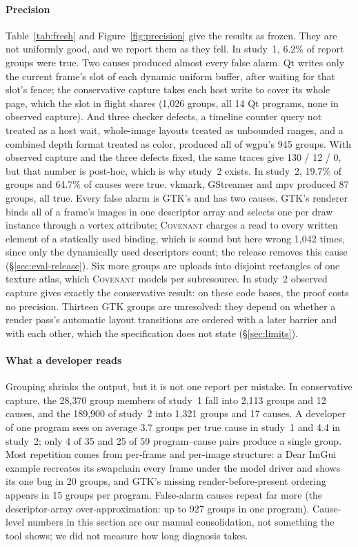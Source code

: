 \documentclass[acmtog,anonymous,review]{acmart}
\newcommand{\sys}{\textsc{Covenant}\xspace}
\begin{document}
\paragraph{Precision}
Table~\ref{tab:fresh} and Figure~\ref{fig:precision} give the results as frozen. They are not uniformly good, and we
report them as they fell. In study~1, 6.2\% of report groups were true. Two causes produced almost every false alarm.
Qt writes only the current frame's slot of each dynamic uniform buffer, after waiting for that slot's fence; the
conservative capture takes each host write to cover its whole page, which the slot in flight shares (1,026 groups,
all 14 Qt programs, none in observed capture). And three checker defects, a timeline counter query not treated as a
host wait, whole-image layouts treated as unbounded ranges, and a combined depth format treated as color, produced all
of wgpu's 945 groups. With observed capture and the three defects fixed, the same traces give 130 / 12 / 0, but that
number is post-hoc, which is why study~2 exists.
In study~2, 19.7\% of groups and 64.7\% of causes were true. vkmark, GStreamer and mpv produced 87 groups,
all true. Every false alarm is GTK's and has two causes. GTK's renderer binds all of a frame's images in one
descriptor array and selects one per draw instance through a vertex attribute; \sys charges a read to every written
element of a statically used binding, which is sound but here wrong 1,042 times, since only the dynamically used
descriptors count; the release removes this cause (\S\ref{sec:eval-release}). Six more groups are uploads into disjoint rectangles of one texture atlas, which \sys models per
subresource. In study~2 observed capture gives exactly the conservative result: on these code bases, the proof costs
no precision. Thirteen GTK groups are unresolved: they depend on whether a render pass's automatic layout transitions
are ordered with a later barrier and with each other, which the specification does not state (\S\ref{sec:limits}).

\paragraph{What a developer reads}
Grouping shrinks the output, but it is not one report per mistake. In conservative capture, the 28,370 group members
of study~1 fall into 2,113 groups and 12 causes, and the 189,900 of study~2 into 1,321 groups and 17 causes. A
developer of one program sees on average 3.7 groups per true cause in study~1 and 4.4 in study~2; only 4 of 35 and
25 of 59 program--cause pairs produce a single group. Most repetition comes from per-frame and per-image structure: a
Dear ImGui example recreates its swapchain every frame under the model driver and shows its one bug in 20 groups, and
GTK's missing render-before-present ordering appears in 15 groups per program. False-alarm causes repeat far
more (the descriptor-array over-approximation: up to 927 groups in one program). Cause-level numbers in this section are our manual consolidation,
not something the tool shows; we did not measure how long diagnosis takes.
\end{document}
